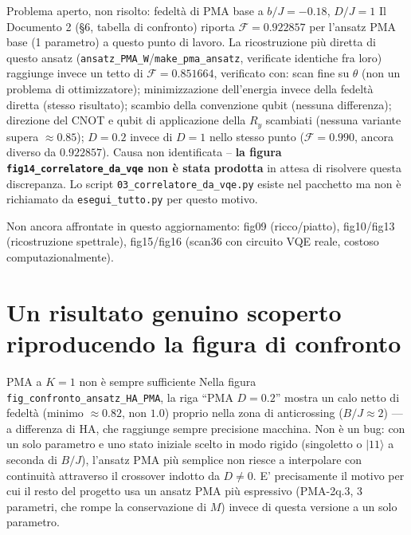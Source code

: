 \documentclass[11pt,a4paper]{article}
\newcommand{\ket}[1]{\lvert #1 \rangle}
\newcommand{\code}[1]{\texttt{\small #1}}
\begin{document}
\begin{warnbox}{Problema aperto, non risolto: fedeltà di PMA base a
$b/J=-0.18$, $D/J=1$}
Il Documento 2 (\S6, tabella di confronto) riporta $\mathcal F=0.922857$
per l'ansatz PMA base (1 parametro) a questo punto di lavoro. La
ricostruzione più diretta di questo ansatz
(\code{ansatz\_PMA\_W}/\code{make\_pma\_ansatz}, verificate identiche
fra loro) raggiunge invece un tetto di $\mathcal F=0.851664$, verificato
con: scan fine su $\theta$ (non un problema di ottimizzatore); minimizzazione
dell'energia invece della fedeltà diretta (stesso risultato); scambio
della convenzione qubit (nessuna differenza); direzione del CNOT e
qubit di applicazione della $R_y$ scambiati (nessuna variante supera
$\approx0.85$); $D=0.2$ invece di $D=1$ nello stesso punto ($\mathcal
F=0.990$, ancora diverso da $0.922857$). Causa non identificata --
\textbf{la figura \code{fig14\_correlatore\_da\_vqe} non è stata
prodotta} in attesa di risolvere questa discrepanza. Lo script
\code{03\_correlatore\_da\_vqe.py} esiste nel pacchetto ma non è
richiamato da \code{esegui\_tutto.py} per questo motivo.
\end{warnbox}

Non ancora affrontate in questo aggiornamento: fig09 (ricco/piatto),
fig10/fig13 (ricostruzione spettrale), fig15/fig16 (scan36 con circuito
VQE reale, costoso computazionalmente).

\section{Un risultato genuino scoperto riproducendo la figura di confronto}
\label{sec:pma-k1}

\begin{warnbox}{PMA a $K=1$ non è sempre sufficiente}
Nella figura \code{fig\_confronto\_ansatz\_HA\_PMA}, la riga ``PMA
$D=0.2$'' mostra un calo netto di fedeltà (minimo $\approx0.82$, non
$1.0$) proprio nella zona di anticrossing ($B/J\approx2$) --- a
differenza di HA, che raggiunge sempre precisione macchina. Non è un
bug: con un solo parametro e uno stato iniziale scelto in modo rigido
(singoletto o $\ket{11}$ a seconda di $B/J$), l'ansatz PMA più semplice
non riesce a interpolare con continuità attraverso il crossover indotto
da $D\neq0$. E' precisamente il motivo per cui il resto del progetto usa
un ansatz PMA più espressivo (PMA-2q.3, 3 parametri, che rompe la
conservazione di $M$) invece di questa versione a un solo parametro.
\end{warnbox}
\end{document}
